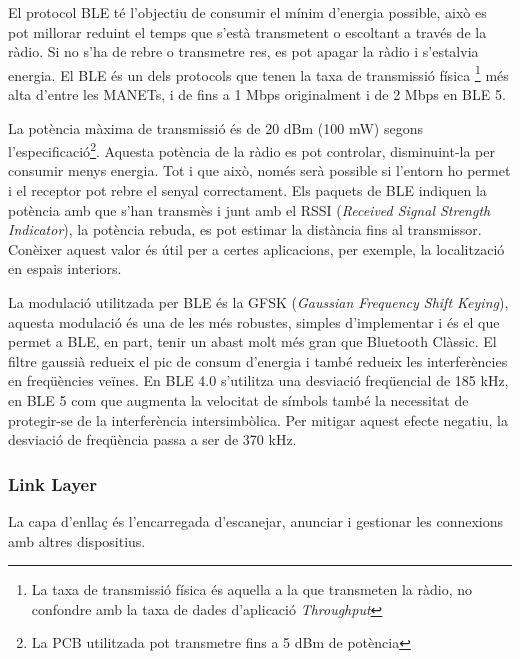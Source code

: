 El protocol BLE té l'objectiu de consumir el mínim d'energia possible, això es pot millorar reduint el temps que s'està transmetent o escoltant a través de la ràdio.
Si no s'ha de rebre o transmetre res, es pot apagar la ràdio i s'estalvia energia.
El BLE és un dels protocols que tenen la taxa de transmissió física \footnote{La taxa de transmissió física és aquella a la que transmeten la ràdio, no confondre amb la taxa de dades d'aplicació \textit{Throughput}} més alta d'entre les MANETs, i de fins a 1 Mbps originalment i de 2 Mbps en BLE 5.

La potència màxima de transmissió és de 20 dBm (100 mW) segons l'especificació\footnote{La PCB utilitzada pot transmetre fins a 5 dBm de potència}.
Aquesta potència de la ràdio es pot controlar, disminuint-la per consumir menys energia.
Tot i que això, només serà possible si l'entorn ho permet i el receptor pot rebre el senyal correctament.
Els paquets de BLE indiquen la potència amb que s'han transmès i junt amb el RSSI (\textit{Received Signal Strength Indicator}), la potència rebuda, es pot estimar la distància fins al transmissor.
Conèixer aquest valor és útil per a certes aplicacions, per exemple, la localització en espais interiors.

La modulació utilitzada per BLE és la GFSK (\textit{Gaussian Frequency Shift Keying}), aquesta modulació és una de les més robustes, simples d'implementar i és el que permet a BLE, en part, tenir un abast molt més gran que Bluetooth Clàssic.
El filtre gaussià redueix el pic de consum d'energia \cite{BLE_Review} i també redueix les interferències en freqüències veïnes.
En BLE 4.0 s'utilitza una desviació freqüencial de 185 kHz, en BLE 5 com que augmenta la velocitat de símbols també la necessitat de protegir-se de la interferència intersimbòlica.
Per mitigar aquest efecte negatiu, la desviació de freqüència passa a ser de 370 kHz.


\subsubsection{Link Layer}
\label{link_layer}
La capa d'enllaç és l'encarregada d'escanejar, anunciar i gestionar les connexions amb altres dispositius.

